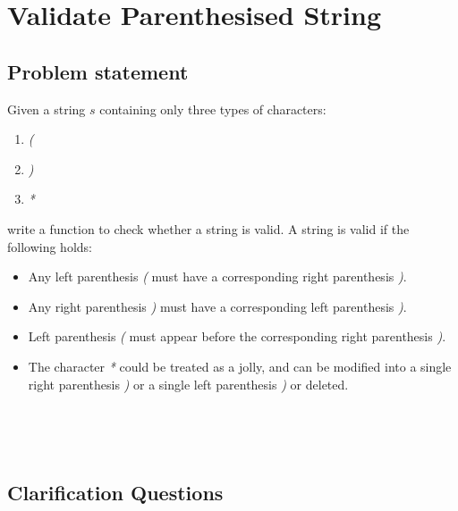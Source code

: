%

\chapter{Validate Parenthesised String}
\label{ch:valid_parenthesis}

\section{Problem statement}
\begin{exercise}
 Given a string $s$ containing only three types of characters:
 \begin{enumerate}
	 \item \textit{(}
	 \item \textit{)}
	 \item \textit{*}
 \end{enumerate}
 write a function to check whether a string is valid. A string is valid if the following  holds:

  \begin{itemize}
	\item  Any left parenthesis \textit{(} must have a corresponding  right parenthesis \textit{)}.
    \item Any right parenthesis \textit{)}  must have a corresponding left parenthesis \textit{)}.
    \item Left parenthesis \textit{(} must appear before the corresponding right parenthesis \textit{)}.
    \item The character \textit{*} could be treated as a jolly, and can be modified into a single right parenthesis  \textit{)} or a single left parenthesis \textit{)} or deleted.
 \end{itemize}  

\end{exercise}


\begin{example}
	\hfill \
	
\end{example}

\begin{example}
	\hfill \
	
\end{example}

\section{Clarification Questions}

